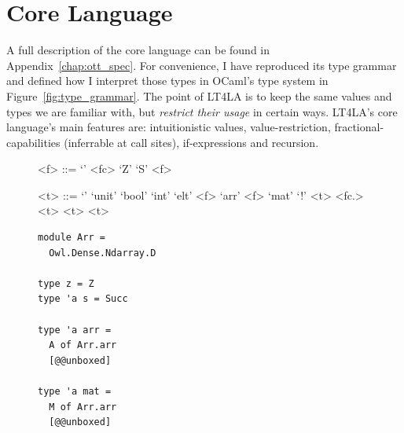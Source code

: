 \section{Core Language}\label{sec:core_lang}

A full description of the core language can be found in
Appendix~\ref{chap:ott_spec}. For convenience, I have reproduced its type
grammar and defined how I interpret those types in OCaml's type system in
Figure~\ref{fig:type_grammar}.  The point of LT4LA is to keep the same values
and types we are familiar with, but \emph{restrict their usage} in certain
ways. LT4LA's core language's main features are: intuitionistic values,
value-restriction, fractional-capabilities (inferrable at call sites),
if-expressions and recursion.

\begin{figure}[tp]
    \centering
    \begin{minipage}{.3\textwidth}
        \centering
        \begin{grammar}
            <f> ::= `'
            \alt <fc>
            \alt `Z'
            \alt `S' <f>

            <t> ::= `'
            \alt `unit'
            \alt `bool'
            \alt `int'
            \alt `elt'
            \alt <f> `arr'
            \alt <f> `mat'
            \alt `!' <t>
            \alt \synt{$\forall$} <fc.> <t>
            \alt <t> \lit{$\otimes$} 
            \alt <t> \lit{$\multimap$} 
        \end{grammar}
    \end{minipage}
    \begin{minipage}{.3\textwidth}
        \centering
        \begin{verbatim}
module Arr =
  Owl.Dense.Ndarray.D

type z = Z
type 'a s = Succ

type 'a arr =
  A of Arr.arr
  [@@unboxed]

type 'a mat =
  M of Arr.arr
  [@@unboxed]


\end{verbatim}
\end{minipage}
\end{figure}
